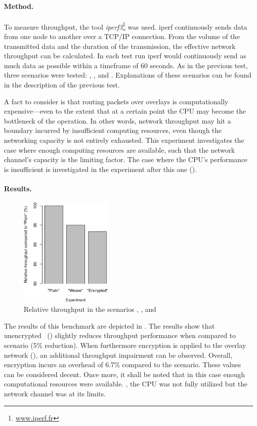 \paragraph{Method.} To measure throughput, the tool \emph{iperf3}\footnote{\url{www.iperf.fr}} was used. iperf continuously sends data from one node to another over a TCP/IP connection. From the volume of the transmitted data and the duration of the transmission, the effective network throughput can be calculated. In each test run iperf would continuously send as much data as possible within a timeframe of 60 seconds. As in the previous test, three scenarios were tested:  , , and . Explanations of these scenarios can be found in the description of the previous test.

A fact to consider is that routing packets over overlays is computationally expensive---even to the extent that at a certain point the CPU may become the bottleneck of the operation. In other words, network throughput may hit a boundary incurred by insufficient computing resources, even though the networking capacity is not entirely exhausted. This experiment investigates the case where enough computing resources are available, such that the network channel's capacity is the limiting factor. The case where the CPU's performance is insufficient is investigated in the experiment after this one (\cf {}).

\paragraph{Results.}
\begin{figure}[htpb]
  \centering
  \includegraphics[width=0.4\textwidth]{figures/throughput}
  \caption[\weave\ throughput benchmark results]{Relative throughput in the scenarios , , and }\label{fig:throughput}
\end{figure}
The results of this benchmark are depicted in . The results show that unencrypted \wnet\ () slightly reduces throughput performance when compared to  scenario (5\% reduction). When furthermore encryption is applied to the overlay network (), an additional throughput impairment can be observed. Overall, encryption incurs an overhead of 6.7\% compared to the  scenario. These values can be considered decent. Once more, it shall be noted that in this case enough computational resources were available. \Ie , the CPU was not fully utilized but the network channel was at its limits.
%
%
%
%
%
%
%
%
%
%


